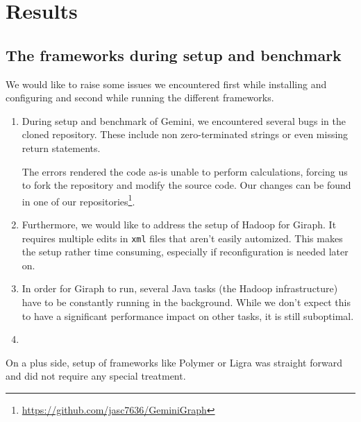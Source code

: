 
\section{Results}



\subsection{The frameworks during setup and benchmark}
We would like to raise some issues we encountered first while installing and configuring and second while running the different frameworks.

\begin{enumerate}
	\item During setup and benchmark of Gemini, we encountered several bugs in the cloned repository. These include non zero-terminated strings or even missing return statements.

	The errors rendered the code as-is unable to perform calculations, forcing us to fork the repository and modify the source code. Our changes can be found in one of our repositories\footnote{\url{https://github.com/jasc7636/GeminiGraph}}.

	\item Furthermore, we would like to address the setup of Hadoop for Giraph. It requires multiple edits in \texttt{xml} files that aren't easily automized. This makes the setup rather time consuming, especially if reconfiguration is needed later on.
	\item In order for Giraph to run, several Java tasks (the Hadoop infrastructure) have to be constantly running in the background. While we don't expect this to have a significant performance impact on other tasks, it is still suboptimal.

	\item 
\end{enumerate}


On a plus side, setup of frameworks like Polymer or Ligra was straight forward and did not require any special treatment. 






